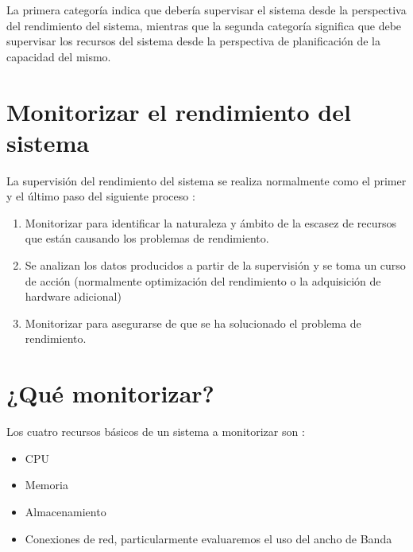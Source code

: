 \documentclass[12pt]{article}
\begin{document}
La primera categoría indica que debería supervisar el sistema desde la 
perspectiva del rendimiento del sistema, mientras que la segunda categoría 
significa que debe supervisar los recursos del sistema desde la perspectiva
de planificación de la capacidad del mismo.

\section*{Monitorizar el rendimiento del sistema}

La supervisión del rendimiento del sistema se realiza normalmente como el 
primer y el último paso del siguiente proceso :

\begin{enumerate}
\item Monitorizar para identificar la naturaleza y ámbito de la escasez de 
recursos que están causando los problemas de rendimiento. 
\item Se analizan los datos producidos a partir de la supervisión y se toma
un curso de acción (normalmente optimización del rendimiento o la 
adquisición de hardware adicional)
\item Monitorizar para asegurarse de que se ha solucionado el problema de 
rendimiento. 
\end{enumerate}

 	


\section*{¿Qué monitorizar?}

Los cuatro recursos básicos de un sistema a monitorizar son :

\begin{itemize}
\item CPU
\item Memoria
\item Almacenamiento
\item Conexiones de red, particularmente evaluaremos el uso del ancho de Banda
\end{itemize}
\end{document}
